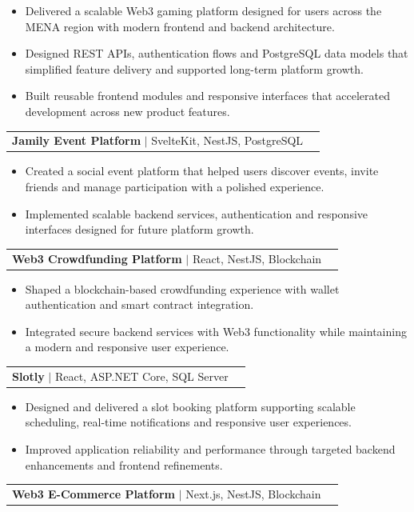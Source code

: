 \documentclass[letterpaper,11pt]{article}
\makeatletter
\newcommand{\resumeItem}[1]{
  \item\small{
    {#1 \vspace{-1pt}}
  }
}
\newcommand{\resumeProjectHeading}[2]{
    \item
    \begin{tabular*}{\textwidth}{l@{\extracolsep{\fill}}r}
      #1 & {\color{dark-grey}} \\
    \end{tabular*}\vspace{-4pt}
}
\newcommand{\resumeItemListStart}{\begin{itemize}}
\newcommand{\resumeItemListEnd}{\end{itemize}\vspace{-2pt}}
\makeatother
\begin{document}
\resumeItemListStart

\resumeItem{Delivered a scalable Web3 gaming platform designed for users across the MENA region with modern frontend and backend architecture.}

\resumeItem{Designed REST APIs, authentication flows and PostgreSQL data models that simplified feature delivery and supported long-term platform growth.}

\resumeItem{Built reusable frontend modules and responsive interfaces that accelerated development across new product features.}

\resumeItemListEnd

\resumeProjectHeading
{\textbf{Jamily Event Platform} $|$ SvelteKit, NestJS, PostgreSQL}{}

\resumeItemListStart

\resumeItem{Created a social event platform that helped users discover events, invite friends and manage participation with a polished experience.}

\resumeItem{Implemented scalable backend services, authentication and responsive interfaces designed for future platform growth.}

\resumeItemListEnd

\resumeProjectHeading
{\textbf{Web3 Crowdfunding Platform} $|$ React, NestJS, Blockchain}{}

\resumeItemListStart

\resumeItem{Shaped a blockchain-based crowdfunding experience with wallet authentication and smart contract integration.}

\resumeItem{Integrated secure backend services with Web3 functionality while maintaining a modern and responsive user experience.}

\resumeItemListEnd

\resumeProjectHeading
{\textbf{Slotly} $|$ React, ASP.NET Core, SQL Server}{}

\resumeItemListStart

\resumeItem{Designed and delivered a slot booking platform supporting scalable scheduling, real-time notifications and responsive user experiences.}

\resumeItem{Improved application reliability and performance through targeted backend enhancements and frontend refinements.}

\resumeItemListEnd

\resumeProjectHeading
{\textbf{Web3 E-Commerce Platform} $|$ Next.js, NestJS, Blockchain}{}
\end{document}
